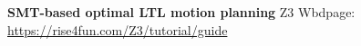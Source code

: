 \documentclass[a4paper, 12pt]{article}
\begin{document}
\begin{problem} {\textbf{SMT-based optimal LTL motion planning}}
\bigskip
\noindent 
Z3 Wbdpage:
\url{https://rise4fun.com/Z3/tutorial/guide}

\newpage
\ \\
\begin{minipage}{1\textwidth}
		\rectangle{\linewidth}{24cm}
\end{minipage}
\newpage
\ \\
\begin{minipage}{1\textwidth}
		\rectangle{\linewidth}{24cm}
\end{minipage}
\newpage
\ \\
\begin{minipage}{1\textwidth}
		\rectangle{\linewidth}{24cm}
\end{minipage}
\newpage
\ \\
\begin{minipage}{1\textwidth}
		\rectangle{\linewidth}{24cm}
\end{minipage}
\newpage
\ \\
\begin{minipage}{1\textwidth}
		\rectangle{\linewidth}{24cm}
\end{minipage}
\newpage
\ \\
\begin{minipage}{1\textwidth}
		\rectangle{\linewidth}{24cm}
\end{minipage}
\end{problem}
\end{document}
